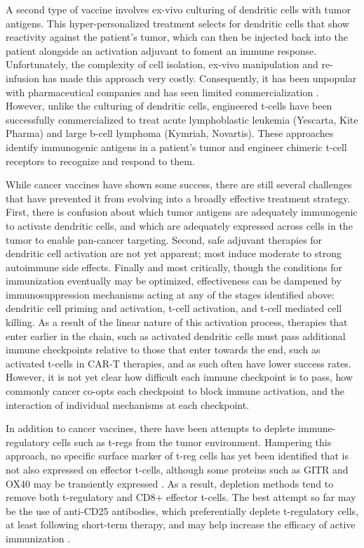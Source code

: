A second type of vaccine involves ex-vivo culturing of dendritic cells with tumor antigens. 
This hyper-personalized treatment selects for dendritic cells that show reactivity against the patient’s tumor, which can then be injected back into the patient alongside an activation adjuvant to foment an immune response. 
Unfortunately, the complexity of cell isolation, ex-vivo manipulation and re-infusion has made this approach very costly. 
Consequently, it has been unpopular with pharmaceutical companies and has seen limited commercialization \citep{Mellman2011}.
However, unlike the culturing of dendritic cells, engineered t-cells have been successfully commercialized to treat acute lymphoblastic leukemia (Yescarta, Kite Pharma) and large b-cell lymphoma (Kymriah, Novartis).
These approaches identify immunogenic antigens in a patient’s tumor and engineer chimeric t-cell receptors to recognize and respond to them.  

While cancer vaccines have shown some success, there are still several challenges that have prevented it from evolving into a broadly effective treatment strategy. 
First, there is confusion about which tumor antigens are adequately immunogenic to activate dendritic cells, and which are adequately expressed across cells in the tumor to enable pan-cancer targeting.
Second, safe adjuvant therapies for dendritic cell activation are not yet apparent; most induce moderate to strong autoimmune side effects. 
Finally and most critically, though the conditions for immunization eventually may be optimized, effectiveness can be dampened by immunosuppression mechanisms acting at any of the stages identified above: dendritic cell priming and activation, t-cell activation, and t-cell mediated cell killing.
As a result of the linear nature of this activation process, therapies that enter earlier in the chain, such as activated dendritic cells must pass additional immune checkpoints relative to those that enter towards the end, such as activated t-cells in CAR-T therapies, and as such often have lower success rates. 
However, it is not yet clear how difficult each immune checkpoint is to pass, how commonly cancer co-opts each checkpoint to block immune activation, and the interaction of individual mechanisms at each checkpoint.

In addition to cancer vaccines, there have been attempts to deplete immune-regulatory cells such as t-regs from the tumor environment. 
Hampering this approach, no specific surface marker of t-reg cells has yet been identified that is not also expressed on effector t-cells, although some proteins such as GITR and OX40 may be transiently expressed \citep{Ito2006,Cohen2010}.
As a result, depletion methods tend to remove both t-regulatory and CD8+ effector t-cells. 
The best attempt so far may be the use of anti-CD25 antibodies, which preferentially deplete t-regulatory cells, at least following short-term therapy, and may help increase the efficacy of active immunization \citep{Golovina2010}. %

